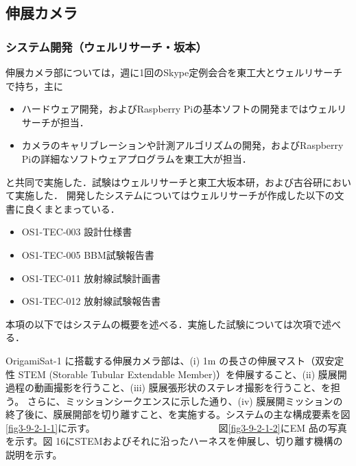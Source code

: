 \subsection{伸展カメラ}
\subsubsection{システム開発（ウェルリサーチ・坂本）}

伸展カメラ部については，週に1回のSkype定例会合を東工大とウェルリサーチで持ち，主に
\begin{itemize}
	\item ハードウェア開発，およびRaspberry Piの基本ソフトの開発まではウェルリサーチが担当．
	\item カメラのキャリブレーションや計測アルゴリズムの開発，およびRaspberry Piの詳細なソフトウェアプログラムを東工大が担当．
\end{itemize}
と共同で実施した．試験はウェルリサーチと東工大坂本研，および古谷研において実施した．
%
開発したシステムについてはウェルリサーチが作成した以下の文書に良くまとまっている．
\begin{itemize}
	\item OS1-TEC-003 設計仕様書
	\item OS1-TEC-005 BBM試験報告書
	\item OS1-TEC-011 放射線試験計画書
	\item OS1-TEC-012 放射線試験報告書
\end{itemize}
本項の以下ではシステムの概要を述べる．実施した試験については次項で述べる．

OrigamiSat-1 に搭載する伸展カメラ部は、(i) 1m の長さの伸展マスト（双安定性 STEM (Storable Tubular Extendable Member)）を伸展すること、(ii) 膜展開過程の動画撮影を行うこと、(iii) 膜展張形状のステレオ撮影を行うこと、を担う。
さらに、ミッションシークエンスに示した通り、(iv) 膜展開ミッションの終了後に、膜展開部を切り離すこと、を実施する。システムの主な構成要素を図\ref{fig3-9-2-1-1}に示す。　　　　　　　　　　　　　
図\ref{fig3-9-2-1-2}にEM 品の写真を示す。図 16にSTEMおよびそれに沿ったハーネスを伸展し、切り離す機構の説明を示す。

